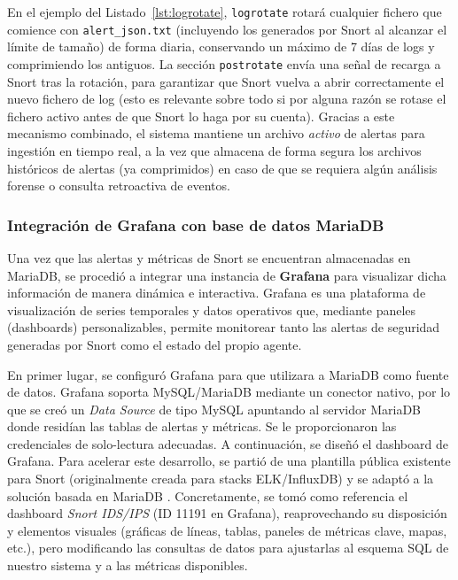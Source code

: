 \documentclass[11pt,a4paper,twoside]{report}
\begin{document}
En el ejemplo del Listado~\ref{lst:logrotate}, \texttt{logrotate} rotará cualquier fichero que comience con \texttt{alert\_json.txt} (incluyendo los generados por Snort al alcanzar el límite de tamaño) de forma diaria, conservando un máximo de 7 días de logs y comprimiendo los antiguos. La sección \texttt{postrotate} envía una señal de recarga a Snort tras la rotación, para garantizar que Snort vuelva a abrir correctamente el nuevo fichero de log (esto es relevante sobre todo si por alguna razón se rotase el fichero activo antes de que Snort lo haga por su cuenta). Gracias a este mecanismo combinado, el sistema mantiene un archivo \textit{activo} de alertas para ingestión en tiempo real, a la vez que almacena de forma segura los archivos históricos de alertas (ya comprimidos) en caso de que se requiera algún análisis forense o consulta retroactiva de eventos.

\subsubsection{Integración de Grafana con base de datos MariaDB}

Una vez que las alertas y métricas de Snort se encuentran almacenadas en MariaDB, se procedió a integrar una instancia de \textbf{Grafana} para visualizar dicha información de manera dinámica e interactiva. Grafana es una plataforma de visualización de series temporales y datos operativos que, mediante paneles (dashboards) personalizables, permite monitorear tanto las alertas de seguridad generadas por Snort como el estado del propio agente.\newline

En primer lugar, se configuró Grafana para que utilizara a MariaDB como fuente de datos. Grafana soporta MySQL/MariaDB mediante un conector nativo, por lo que se creó un \textit{Data Source} de tipo MySQL apuntando al servidor MariaDB donde residían las tablas de alertas y métricas. Se le proporcionaron las credenciales de solo-lectura adecuadas. A continuación, se diseñó el dashboard de Grafana. Para acelerar este desarrollo, se partió de una plantilla pública existente para Snort (originalmente creada para stacks ELK/InfluxDB) y se adaptó a la solución basada en MariaDB \cite{grafana-dashboard}. Concretamente, se tomó como referencia el dashboard \emph{Snort IDS/IPS} (ID 11191 en Grafana), reaprovechando su disposición y elementos visuales (gráficas de líneas, tablas, paneles de métricas clave, mapas, etc.), pero modificando las consultas de datos para ajustarlas al esquema SQL de nuestro sistema y a las métricas disponibles.\newline
\end{document}
